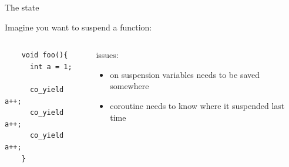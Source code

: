 \documentclass[10pt]{beamer}
\begin{document}

\begin{frame}[fragile]{The state}

\centerline{Imagine you want to suspend a function:}

\vfill

\begin{columns}
\begin{column}{0.48\linewidth}
\begin{verbatim}
    void foo(){
      int a = 1;

      co_yield a++;
      co_yield a++;
      co_yield a++;
    }
\end{verbatim}
\end{column}
\pause
\begin{column}{0.48\linewidth}

\centerline{issues:}

\begin{itemize}[<+- |alert@+>]
  \item on suspension variables needs to be saved somewhere
  \item coroutine needs to know where it suspended last time
\end{itemize}

\end{column}
\end{columns}
\end{frame}
\end{document}
